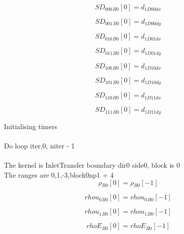 \documentclass{article}
\begin{document}
\begin{dmath}{SD_{000}{_{B0}}}[{0}] = d_{1 D00 dx}\end{dmath}

\begin{dmath}{SD_{001}{_{B0}}}[{0}] = d_{1 D00 dy}\end{dmath}

\begin{dmath}{SD_{010}{_{B0}}}[{0}] = d_{1 D01 dx}\end{dmath}

\begin{dmath}{SD_{011}{_{B0}}}[{0}] = d_{1 D01 dy}\end{dmath}

\begin{dmath}{SD_{100}{_{B0}}}[{0}] = d_{1 D10 dx}\end{dmath}

\begin{dmath}{SD_{101}{_{B0}}}[{0}] = d_{1 D10 dy}\end{dmath}

\begin{dmath}{SD_{110}{_{B0}}}[{0}] = d_{1 D11 dx}\end{dmath}

\begin{dmath}{SD_{111}{_{B0}}}[{0}] = d_{1 D11 dy}\end{dmath}

\noindent Initialising timers\\
\\\noindent Do loop iter,0, niter - 1\\
\\\noindent The kernel is InletTransfer boundary dir0 side0, block is 0\\\noindent The ranges are 0,1,-3,block0np1 + 4\\\begin{dmath}{\rho{_{B0}}}[{0}] = {\rho{_{B0}}}[{-1}]\end{dmath}

\begin{dmath}{rhou_{0}{_{B0}}}[{0}] = {rhou_{0}{_{B0}}}[{-1}]\end{dmath}

\begin{dmath}{rhou_{1}{_{B0}}}[{0}] = {rhou_{1}{_{B0}}}[{-1}]\end{dmath}

\begin{dmath}{rhoE{_{B0}}}[{0}] = {rhoE{_{B0}}}[{-1}]\end{dmath}
\end{document}
